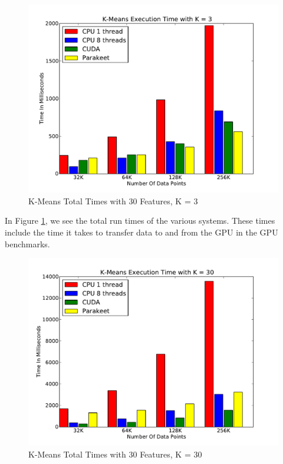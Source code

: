 \documentclass[preprint]{sigplanconf}
\begin{document}
\begin{figure}
\includegraphics[scale=0.45]{KMCPUK3.pdf}
\caption{K-Means Total Times with 30 Features, K = 3}
\label{KMCPU3}
\end{figure}

In Figure \ref{KMCPU3}, we see the total run times of the various systems. These times include the time it takes to transfer data to and from the GPU in the GPU benchmarks.

\begin{figure}
\includegraphics[scale=0.45]{KMCPUK30.pdf}
\caption{K-Means Total Times with 30 Features, K = 30}
\label{KMCPU30}
\end{figure}
\end{document}
